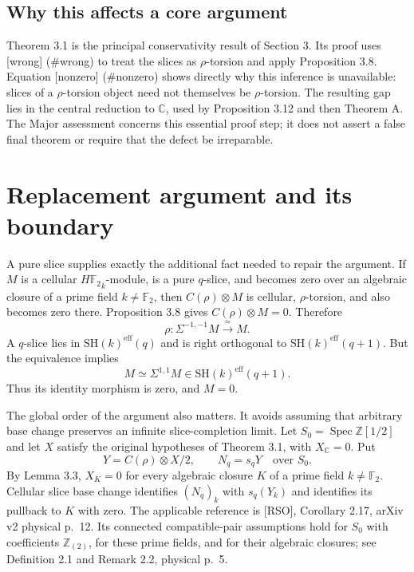 \documentclass[10pt]{article}
\begin{document}
\subsection*{Why this affects a core argument}
Theorem 3.1 is the principal conservativity result of Section 3. Its proof uses [wrong] (\#wrong) to treat the slices as \(\rho\)-torsion and apply Proposition 3.8. Equation [nonzero] (\#nonzero) shows directly why this inference is unavailable: slices of a \(\rho\)-torsion object need not themselves be \(\rho\)-torsion. The resulting gap lies in the central reduction to \(\mathbb C\), used by Proposition 3.12 and then Theorem A. The Major assessment concerns this essential proof step; it does not assert a false final theorem or require that the defect be irreparable.\par
\section*{Replacement argument and its boundary}
A pure slice supplies exactly the additional fact needed to repair the argument. If \(M\) is a cellular \({H\mathbb F_2}_k\)-module, is a pure \(q\)-slice, and becomes zero over an algebraic closure of a prime field \(k\ne\mathbb F_2\), then \(C(\rho)\otimes M\) is cellular, \(\rho\)-torsion, and also becomes zero there. Proposition 3.8 gives \(C(\rho)\otimes M=0\). Therefore \[\rho:\Sigma^{-1,-1}M\xrightarrow{\ \simeq\ }M.\] A \(q\)-slice lies in \(\mathrm{SH}(k)^{\mathrm{eff}}(q)\) and is right orthogonal to \(\mathrm{SH}(k)^{\mathrm{eff}}(q+1)\). But the equivalence implies \[M\simeq\Sigma^{1,1}M
      \in\mathrm{SH}(k)^{\mathrm{eff}}(q+1).\] Thus its identity morphism is zero, and \(M=0\).\par
The global order of the argument also matters. It avoids assuming that arbitrary base change preserves an infinite slice-completion limit. Let \(S_0=\operatorname{Spec}\mathbb Z[1/2]\) and let \(X\) satisfy the original hypotheses of Theorem 3.1, with \(X_{\mathbb C}=0\). Put \[Y=C(\rho)\otimes X/2,\qquad N_q=s_qY
 \quad\text{over }S_0.\] By Lemma 3.3, \(X_K=0\) for every algebraic closure \(K\) of a prime field \(k\ne\mathbb F_2\). Cellular slice base change identifies \((N_q)_k\) with \(s_q(Y_k)\) and identifies its pullback to \(K\) with zero. The applicable reference is [RSO], Corollary 2.17, arXiv v2 physical p. 12. Its connected compatible-pair assumptions hold for \(S_0\) with coefficients \(\mathbb Z_{(2)}\), for these prime fields, and for their algebraic closures; see Definition 2.1 and Remark 2.2, physical p. 5.\par
\end{document}
